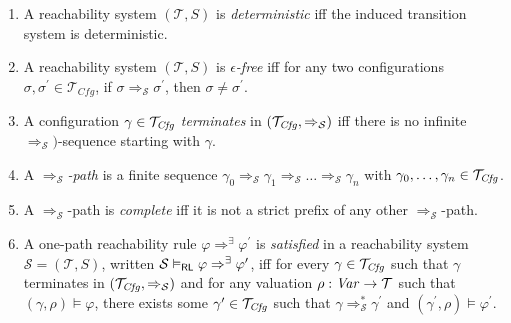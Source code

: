 \begin{definition}
\begin{enumerate}
    \item A reachability system $(\mathcal{T}, S)$ is \emph{deterministic} iff the induced transition system
          is deterministic.
          
    \item A reachability system $(\mathcal{T}, S)$ is \emph{$\epsilon$-free}
          iff for any two configurations $\sigma, \sigma^\prime \in \mathcal{T}_{\mathit{Cfg}}$, if
          $\sigma \Rightarrow_{\mathcal{S}} \sigma^\prime$, then $\sigma \not = \sigma^\prime$.

    \item A configuration $\gamma \in \mathcal{T}_{\mathit{Cfg}}$ \emph{terminates} in $(\mathcal{T}_{\mathit{Cfg}} , \Rightarrow_{\mathcal{S}})$
          iff there is no infinite $\Rightarrow_{\mathcal{S}})$-sequence starting with $\gamma$.
          
    \item A \emph{$\Rightarrow_{\mathcal{S}}$-path} is a finite
          sequence $\gamma_0 \Rightarrow_{\mathcal{S}} \gamma_1 \Rightarrow_{\mathcal{S}} \ldots
          \Rightarrow_{\mathcal{S}} \gamma_n$
          with $\gamma_0,\ldots,\gamma_n \in \mathcal{T}_{\mathit{Cfg}}$.
          
    \item A $\Rightarrow_{\mathcal{S}}$-path is \emph{complete}
          iff it is not a strict prefix of any
          other $\Rightarrow_{\mathcal{S}}$-path.

    \item \label{def:oprlSemantics}
          A one-path reachability rule $\varphi \Rightarrow^\exists \varphi^\prime$ is \emph{satisfied}
          in a reachability system $\mathcal{S} = (\mathcal{T}, S)$,
          written $\mathcal{S} \vDash_{\mathsf{RL}} \varphi \Rightarrow^\exists \varphi^\prime$,
          iff for every $\gamma \in \mathcal{T}_{\mathit{Cfg}}$
          such that $\gamma$ terminates in $(\mathcal{T}_{\mathit{Cfg}}, \Rightarrow_{\mathcal{S}})$
          and for any valuation $\rho : \mathit{Var} \to \mathcal{T}$
          such that $(\gamma, \rho) \vDash \varphi$,
          there exists some $\gamma^\prime \in \mathcal{T}_{\mathit{Cfg}}$
          such that
          $\gamma \Rightarrow^{*}_{\mathcal{S}} \gamma^\prime$
          and $(\gamma^\prime, \rho) \vDash \varphi^\prime$.
          
          
%    
\end{enumerate}

\end{definition}

